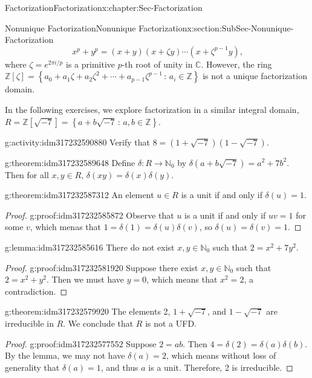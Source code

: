 \documentclass[oneside,10pt,]{book}
\numberwithin{equation}{section}
\newcommand{\setof}[2]{{\left\{#1\,\colon\,#2\right\}}}
\def\C{{\mathbb C}}
\def\Z{{\mathbb Z}}
\def\N{{\mathbb N}}
\begin{document}
\begin{chapterptx}{Factorization}{}{Factorization}{}{}{x:chapter:Sec-Factorization}
\begin{sectionptx}{Nonunique Factorization}{}{Nonunique Factorization}{}{}{x:section:SubSec-Nonunique-Factorization}
\begin{equation*}
x^p + y^p = (x+y)(x+\zeta y) \cdots (x+\zeta^{p-1}y)\text{,}
\end{equation*}
where \(\zeta = e^{2\pi i/p}\) is a primitive \(p\)-th root of unity in \(\C\). However, the ring \(\Z[\zeta] = \setof{a_0 + a_1 \zeta + a_2 \zeta^2 + \cdots + a_{p-1} \zeta^{p-1}}{a_i\in\Z}\) is not a unique factorization domain.%
\par
In the following exercises, we explore factorization in a similar integral domain, \(R = \Z[\sqrt{-7}] = \setof{a+b\sqrt{-7}}{a,b\in\Z}\).%
\begin{activity}{}{g:activity:idm317232590880}%
Verify that \(8 = (1+\sqrt{-7})(1-\sqrt{-7})\).%
\end{activity}
\begin{theorem}{}{}{g:theorem:idm317232589648}%
Define \(\delta : R \to \N_0\) by \(\delta(a+b\sqrt{-7}) = a^2 + 7 b^2\). Then for all \(x,y\in R\), \(\delta(xy) = \delta(x)\delta(y)\).%
\end{theorem}
\begin{theorem}{}{}{g:theorem:idm317232587312}%
An element \(u\in R\) is a unit if and only if \(\delta(u) = 1\).%
\end{theorem}
\begin{proof}{}{g:proof:idm317232585872}
Observe that \(u\) is a unit if and only if \(uv = 1\) for some \(v\), which menas that \(1 = \delta(1) = \delta(u) \delta(v)\), so \(\delta(u) = \delta(v) = 1\).%
\end{proof}
\begin{lemma}{}{}{g:lemma:idm317232585616}%
There do not exist \(x,y\in \N_0\) such that \(2 = x^2 + 7y^2\).%
\end{lemma}
\begin{proof}{}{g:proof:idm317232581920}
Suppose there exist \(x,y\in \N_0\) such that \(2 = x^2 + y^2\). Then we must have \(y = 0\), which means that \(x^2 = 2\), a contradiction.%
\end{proof}
\begin{theorem}{}{}{g:theorem:idm317232579920}%
The elements 2, \(1+ \sqrt{-7}\), and \(1-\sqrt{-7}\) are irreducible in \(R\). We conclude that \(R\) is not a UFD.%
\end{theorem}
\begin{proof}{}{g:proof:idm317232577552}
Suppose \(2 = ab\). Then \(4 = \delta(2) = \delta(a)\delta(b)\). By the lemma, we may not have \(\delta(a) = 2\), which means without loss of generality that \(\delta(a) = 1\), and thus \(a\) is a unit. Therefore, 2 is irreducible.%
\par

\end{proof}
\end{sectionptx}
\end{chapterptx}
\end{document}
